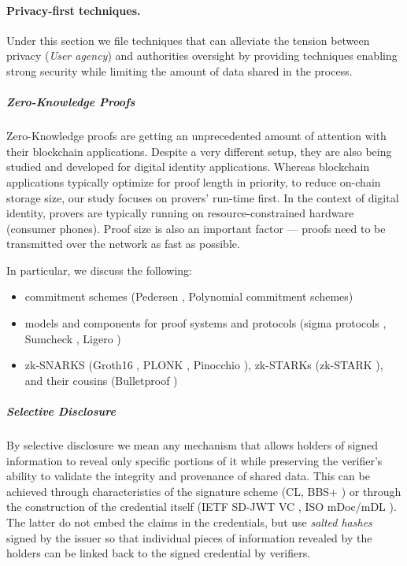\paragraph{Privacy-first techniques.} Under this section we file techniques that can alleviate the tension between privacy (\emph{User agency}) and authorities oversight by providing techniques enabling strong security while limiting the amount of data shared in the process.

\subparagraph{Zero-Knowledge Proofs} Zero-Knowledge proofs are getting an unprecedented amount of attention with their blockchain applications. 
Despite a very different setup, they are also being studied and developed for digital identity applications.
Whereas blockchain applications typically optimize for proof length in priority, to reduce on-chain storage size, our study focuses on provers' run-time first. In the context of digital identity, provers are typically running on resource-constrained hardware (consumer phones). Proof size is also an important factor --- proofs need to be transmitted over the network as fast as possible.  

In particular, we discuss the following:

\begin{itemize}
    \item commitment schemes (Pedersen \cite{PD91}, Polynomial commitment schemes)
    \item models and components for proof systems and protocols (sigma protocols \cite{SP90}, Sumcheck \cite{LCF92}, Ligero \cite{AHIV22})
    \item zk-SNARKS (Groth16 \cite{G16}, PLONK \cite{GWC90}, Pinocchio \cite{PHGR13}), zk-STARKs (zk-STARK \cite{BCG18}), and their cousins (Bulletproof \cite{BBD18})
\end{itemize}

\subparagraph{Selective Disclosure} By selective disclosure we mean any mechanism that allows holders of signed information to reveal only specific portions of it while preserving the verifier's ability to validate the integrity and provenance of shared data. This can be achieved through characteristics of the signature scheme (CL, BBS+ \cite{ASM06}) or through the construction of the credential itself (IETF SD-JWT VC \cite{SDJWT}, ISO mDoc/mDL \cite{ISO18013-5_2021}).
The latter do not embed the claims in the credentials, but use \emph{salted hashes} signed by the issuer so that individual pieces of information revealed by the holders can be linked back to the signed credential by verifiers.

